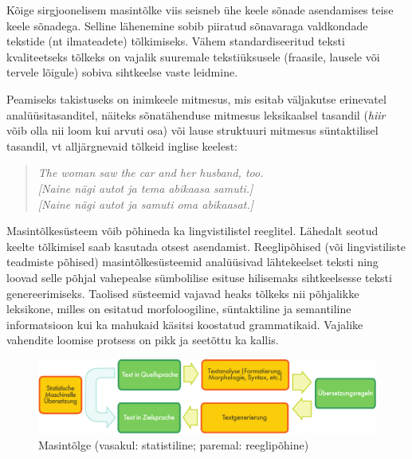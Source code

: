\begin{multicols}{2}
Kõige sirgjoonelisem masintõlke viis seisneb ühe keele sõnade asendamises teise keele sõnadega. 
Selline lähenemine sobib piiratud sõnavaraga valdkondade tekstide (nt ilmateadete) tõlkimiseks. 
Vähem standardiseeritud teksti kvaliteetseks tõlkeks on vajalik suuremale tekstiüksusele (fraasile, lausele või tervele lõigule) sobiva sihtkeelse vaste leidmine. 


Peamiseks takistuseks on inimkeele mitmesus, mis esitab väljakutse erinevatel analüüsitasanditel, näiteks sõnatähenduse mitmesus leksikaalsel tasandil (\textit{hiir} võib olla nii loom kui arvuti osa) või lause struktuuri mitmesus süntaktilisel tasandil, vt alljärgnevaid tõlkeid inglise keelest: 

\begin{quote}
\textit{The woman saw the car and her husband, too.\\
{[}Naine nägi autot ja tema abikaasa samuti.{]}\\
{[}Naine nägi autot ja samuti oma abikaasat.{]}}
\end{quote}

Masintõlkesüsteem võib põhineda ka lingvistilistel reeglitel. 
Lähedalt seotud keelte tõlkimisel saab kasutada otsest asendamist. 
Reeglipõhised (või lingvistiliste teadmiste põhised) masintõlkesüsteemid analüüsivad lähtekeelset teksti ning loovad selle põhjal vahepealse sümbolilise esituse hilisemaks sihtkeelsesse teksti genereerimiseks. 
Taolised süsteemid vajavad heaks tõlkeks nii põhjalikke leksikone, milles on esitatud morfoloogiline, süntaktiline ja semantiline informatsioon kui ka mahukaid käsitsi koostatud grammatikaid. 
Vajalike vahendite loomise protsess on pikk ja seetõttu ka kallis. 

\begin{figure}[htb]
  \center
  \includegraphics[width=\textwidth]{../_media/german/machine_translation}
  \caption{Masintõlge (vasakul: statistiline; paremal: reeglipõhine)}
  \label{fig:mtarch_ee}
\end{figure}


\end{multicols}
